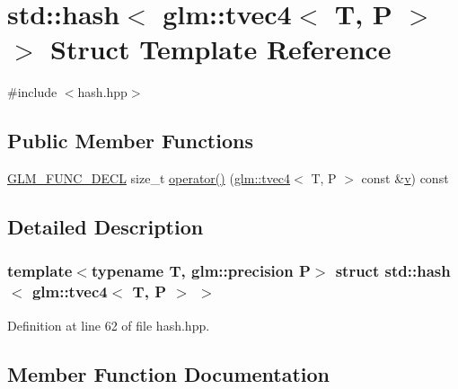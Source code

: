 \hypertarget{structstd_1_1hash_3_01glm_1_1tvec4_3_01_t_00_01_p_01_4_01_4}{}\section{std\+::hash$<$ glm\+::tvec4$<$ T, P $>$ $>$ Struct Template Reference}
\label{structstd_1_1hash_3_01glm_1_1tvec4_3_01_t_00_01_p_01_4_01_4}


{\ttfamily \#include $<$hash.\+hpp$>$}

\subsection*{Public Member Functions}
\begin{DoxyCompactItemize}
\item 
\mbox{\hyperlink{setup_8hpp_ab2d052de21a70539923e9bcbf6e83a51}{G\+L\+M\+\_\+\+F\+U\+N\+C\+\_\+\+D\+E\+CL}} size\+\_\+t \mbox{\hyperlink{structstd_1_1hash_3_01glm_1_1tvec4_3_01_t_00_01_p_01_4_01_4_a019cfa9e9c08d44625fde235650a03dc}{operator()}} (\mbox{\hyperlink{structglm_1_1tvec4}{glm\+::tvec4}}$<$ T, P $>$ const \&\mbox{\hyperlink{glad_8h_a14cfbe2fc2234f5504618905b69d1e06}{v}}) const
\end{DoxyCompactItemize}


\subsection{Detailed Description}
\subsubsection*{template$<$typename T, glm\+::precision P$>$\newline
struct std\+::hash$<$ glm\+::tvec4$<$ T, P $>$ $>$}



Definition at line 62 of file hash.\+hpp.



\subsection{Member Function Documentation}
\mbox{\label{structstd_1_1hash_3_01glm_1_1tvec4_3_01_t_00_01_p_01_4_01_4_a019cfa9e9c08d44625fde235650a03dc}} 
